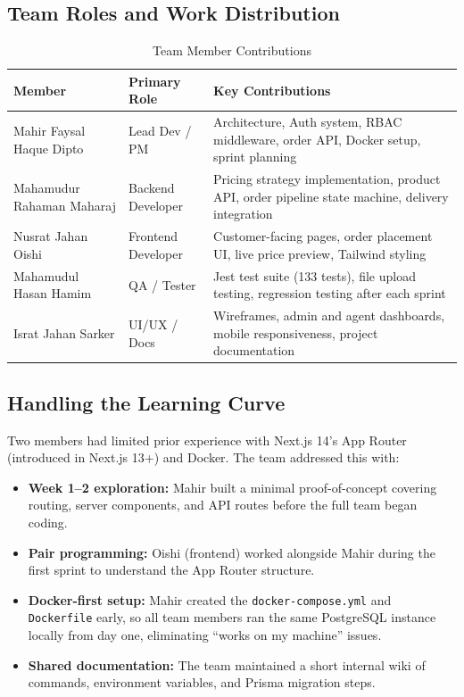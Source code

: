 \documentclass[12pt,a4paper]{report}
\begin{document}
\subsection{Team Roles and Work Distribution}

\begin{table}[H]
  \centering
  \caption{Team Member Contributions}
  \begin{tabularx}{\textwidth}{L{3.5cm} L{3cm} X}
    \toprule
    \textbf{Member} & \textbf{Primary Role} & \textbf{Key Contributions} \\
    \midrule
    Mahir Faysal Haque Dipto
      & Lead Dev / PM
      & Architecture, Auth system, RBAC middleware, order API, Docker setup, sprint planning \\
    Mahamudur Rahaman Maharaj
      & Backend Developer
      & Pricing strategy implementation, product API, order pipeline state machine, delivery integration \\
    Nusrat Jahan Oishi
      & Frontend Developer
      & Customer-facing pages, order placement UI, live price preview, Tailwind styling \\
    Mahamudul Hasan Hamim
      & QA / Tester
      & Jest test suite (133 tests), file upload testing, regression testing after each sprint \\
    Israt Jahan Sarker
      & UI/UX / Docs
      & Wireframes, admin and agent dashboards, mobile responsiveness, project documentation \\
    \bottomrule
  \end{tabularx}
\end{table}

\subsection{Handling the Learning Curve}

Two members had limited prior experience with Next.js 14's App Router (introduced in Next.js 13+) and Docker. The team addressed this with:

\begin{itemize}
  \item \textbf{Week 1--2 exploration:} Mahir built a minimal proof-of-concept covering routing, server components, and API routes before the full team began coding.
  \item \textbf{Pair programming:} Oishi (frontend) worked alongside Mahir during the first sprint to understand the App Router structure.
  \item \textbf{Docker-first setup:} Mahir created the \texttt{docker-compose.yml} and \texttt{Dockerfile} early, so all team members ran the same PostgreSQL instance locally from day one, eliminating ``works on my machine'' issues.
  \item \textbf{Shared documentation:} The team maintained a short internal wiki of commands, environment variables, and Prisma migration steps.
\end{itemize}
\end{document}
